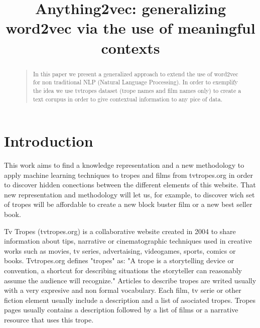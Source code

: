 \documentclass[letterpaper]{article}
\title{Anything2vec: generalizing word2vec via the use of meaningful
  contexts}
\begin{document}
 
\maketitle
\begin{abstract}
\begin{quote}
In this paper we present a generalized approach to extend the use of word2vec for non traditional NLP (Natural Language Processing). In order to exemplify the idea we use tvtropes dataset (trope names and film names only) to create a text corupus in order to give contextual information to any pice of data.
\end{quote}
\end{abstract}

\section{Introduction}


This work aims to find a knowledge representation and a new methodology to apply machine learning techniques to tropes and films from tvtropes.org in order to discover hidden conections between the different elements of this website. That new representation and methodology will let us, for example, to discover wich set of tropes will be affordable to create a new block buster film or a new best seller book.   

Tv Tropes (tvtropes.org) is a collaborative website created in 2004 to share information about tips, narrative or cinematographic techniques used in creative works such as movies, tv series, advertaising, videogames, sports, comics or books. Tvtropes.org defines "tropes" as: "A trope is a storytelling device or convention, a shortcut for describing situations the storyteller can reasonably assume the audience will recognize." Articles to describe tropes are writed usually with a very expresive and non formal vocabulary. Each film, tv serie or other fiction element usually include a description and a list of asociated tropes. Tropes pages usually contains a description followed by a list of films or a narrative resource that uses this trope.   
\end{document}
